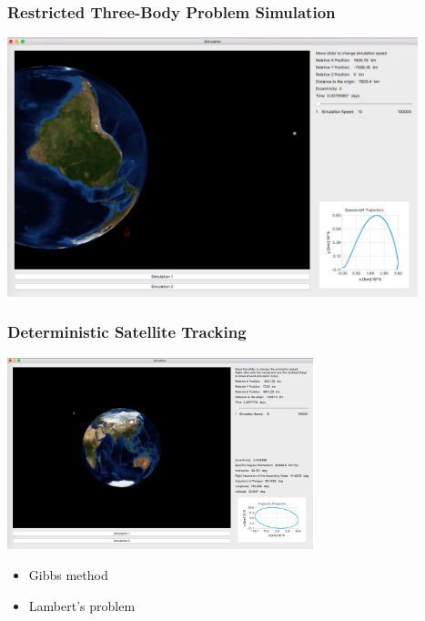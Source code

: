 \documentclass[mathserif]{beamer}
\begin{document}
\begin{frame}
\frametitle{Restricted Three-Body Problem Simulation}

\includegraphics[width=4.7in]{Restricted3Body.png}


\end{frame}



\begin{frame}
\frametitle{Deterministic Satellite Tracking}

\includegraphics[width=3.5in]{sat3.png}

\begin{itemize}
\item Gibbs method
\item Lambert's problem
\end{itemize}

\end{frame}
\end{document}
